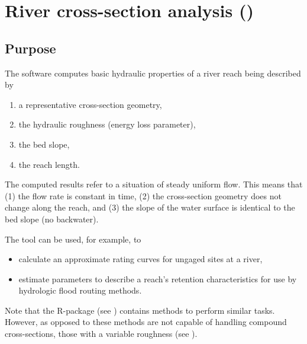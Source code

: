 
\chapter{River cross-section analysis ()} \label{chap:xsanalyzer}
\renewcommand{\tabdir}{chapters/xsAnalyzer/tab}
\renewcommand{\figdir}{chapters/xsAnalyzer/fig}

\section{Purpose} \label{sec:xsanalyzer:purpose}
The  software computes basic hydraulic properties of a river reach being described by
\begin{enumerate}
  \item a representative cross-section geometry,
  \item the hydraulic roughness (energy loss parameter),
  \item the bed slope,
  \item the reach length.
\end{enumerate}

The computed results refer to a situation of steady uniform flow. This means that (1) the flow rate is constant in time, (2) the cross-section geometry does not change along the reach, and (3) the slope of the water surface is identical to the bed slope (no backwater).

The  tool can be used, for example, to
\begin{itemize}
  \item calculate an approximate rating curves for ungaged sites at a river,
  \item estimate parameters to describe a reach's retention characteristics for use by hydrologic flood routing methods.
\end{itemize}

Note that the R-package  (see ) contains methods to perform similar tasks. However, as opposed to  these methods are not capable of handling compound cross-sections, \ie{} those with a variable roughness (see ).

